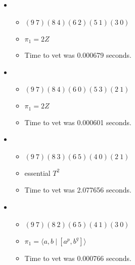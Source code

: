 \documentclass{article}
\begin{document}
\begin{itemize}
\begin{itemize}
\end{itemize}
\item \begin{itemize}
      \item $(9\ 7)(8\ 4)(6\ 2)(5\ 1)(3\ 0)$
      \item $\pi_1 =2 Z$
      \item Time to vet was 0.000679 seconds.
\end{itemize}
\item \begin{itemize}
      \item $(9\ 7)(8\ 4)(6\ 0)(5\ 3)(2\ 1)$
      \item $\pi_1 =2 Z$
      \item Time to vet was 0.000601 seconds.
\end{itemize}
\item \begin{itemize}
      \item $(9\ 7)(8\ 3)(6\ 5)(4\ 0)(2\ 1)$
      \item essential $T^2$
      \item Time to vet was 2.077656 seconds.
\end{itemize}
\item \begin{itemize}
      \item $(9\ 7)(8\ 2)(6\ 5)(4\ 1)(3\ 0)$
      \item $\pi_1 = \langle a,b\ |\ [a^p,b^q]\rangle$
      \item Time to vet was 0.000766 seconds.
\end{itemize}
\end{itemize}
\end{document}
